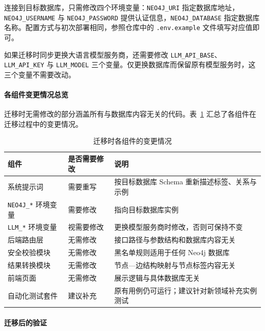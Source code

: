 \documentclass[12pt,a4paper]{article}
\begin{document}
连接到目标数据库，只需修改四个环境变量：\texttt{NEO4J\_URI} 指定数据库地址，\texttt{NEO4J\_USERNAME} 与 \texttt{NEO4J\_PASSWORD} 提供认证信息，\texttt{NEO4J\_DATABASE} 指定数据库名称。配置方式与初次部署相同，参照仓库中的 \texttt{.env.example} 文件填写对应值即可。

如果迁移时同步更换大语言模型服务商，还需要修改 \texttt{LLM\_API\_BASE}、\texttt{LLM\_API\_KEY} 与 \texttt{LLM\_MODEL} 三个变量。仅更换数据库而保留原有模型服务时，这三个变量不需要改动。

\paragraph{各组件变更情况总览}

迁移时无需修改的部分涵盖所有与数据库内容无关的代码。表~\ref{tab:migration-scope} 汇总了各组件在迁移过程中的变更情况。

\begin{table}[H]
    \centering
    \caption{迁移时各组件的变更情况}
    \label{tab:migration-scope}
    \small
    \begin{tabular}{p{3.5cm}p{2.2cm}p{6.0cm}}
        \toprule
        \textbf{组件} & \textbf{是否需要修改} & \textbf{说明} \\
        \midrule
        系统提示词 & 需要重写 & 按目标数据库 Schema 重新描述标签、关系与示例 \\
        \texttt{NEO4J\_*} 环境变量 & 需要修改 & 指向目标数据库实例 \\
        \texttt{LLM\_*} 环境变量 & 视需要修改 & 更换模型服务商时修改，否则可保持不变 \\
        后端路由层 & 无需修改 & 接口路径与参数结构和数据库内容无关 \\
        安全校验模块 & 无需修改 & 黑名单规则适用于任何 Neo4j 数据库 \\
        结果转换模块 & 无需修改 & 节点—边结构映射与节点标签内容无关 \\
        前端页面 & 无需修改 & 展示逻辑与具体数据库无关 \\
        自动化测试套件 & 建议补充 & 原有用例仍可运行；建议针对新领域补充实例测试 \\
        \bottomrule
    \end{tabular}
\end{table}

\paragraph{迁移后的验证}
\end{document}
